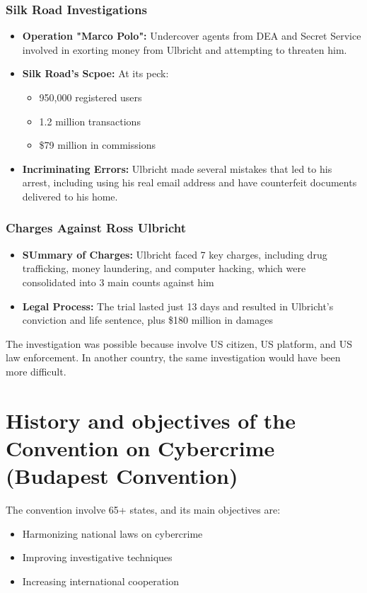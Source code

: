\subsubsection{Silk Road Investigations}

\begin{itemize}[itemsep=0pt]
  \item \textbf{Operation "Marco Polo":} Undercover agents from DEA and Secret Service involved in exorting money from Ulbricht and attempting to threaten him.
  \item \textbf{Silk Road's Scpoe:} At its peck:
    \begin{itemize}[itemsep=0pt]
      \item 950,000 registered users
      \item 1.2 million transactions
      \item \$79 million in commissions
    \end{itemize}
  \item \textbf{Incriminating Errors:} Ulbricht made several mistakes that led to his arrest, including using his real email address and have counterfeit documents delivered to his home.
\end{itemize}

\subsubsection{Charges Against Ross Ulbricht}
\begin{itemize}[itemsep=0pt]
  \item \textbf{SUmmary of Charges:} Ulbricht faced 7 key charges, including drug trafficking, money laundering, and computer hacking, which were consolidated into 3 main counts against him
  \item \textbf{Legal Process:} The trial lasted just 13 days and resulted in Ulbricht's conviction and life sentence, plus \$180 million in damages
\end{itemize}

The investigation was possible because involve US citizen, US platform, and US law enforcement. In another country, the same investigation would have been more difficult.

\section{History and objectives of the Convention on Cybercrime (Budapest Convention)}

The convention involve 65+ states, and its main objectives are:
\begin{itemize}[itemsep=0pt]
  \item Harmonizing national laws on cybercrime
  \item Improving investigative techniques
  \item Increasing international cooperation
\end{itemize}

